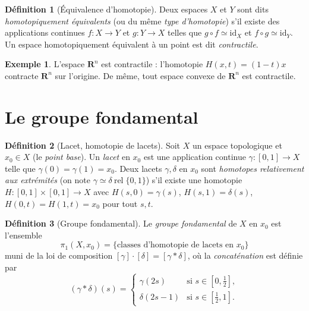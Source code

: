 \documentclass[12pt,a4paper,openany]{book}
\theoremstyle{definition}
\newtheorem{definition}{Définition}[chapter]
\theoremstyle{cours}
\theoremstyle{coursnormal}
\newtheorem{exemple}[theoreme]{Exemple}
\begin{document}
\begin{definition}[Équivalence d'homotopie]
\label{def:equivalence-homotopie}
Deux espaces $X$ et $Y$ sont dits \emph{homotopiquement équivalents}
(ou du même \emph{type d'homotopie}) s'il existe des applications
continues $f\colon X\to Y$ et $g\colon Y\to X$ telles que
$g\circ f\simeq\mathrm{id}_X$ et $f\circ g\simeq\mathrm{id}_Y$.
Un espace homotopiquement équivalent à un point est dit
\emph{contractile}.
\end{definition}

\begin{exemple}
\label{ex:Rn-contractile}
L'espace $\mathbf{R}^n$ est contractile : l'homotopie
$H(x,t)=(1-t)x$ contracte $\mathbf{R}^n$ sur l'origine.
De même, tout espace convexe de $\mathbf{R}^n$ est contractile.
\end{exemple}

\section{Le groupe fondamental}
\label{sec:groupe-fondamental}

\begin{definition}[Lacet, homotopie de lacets]
\label{def:lacet}
Soit $X$ un espace topologique et $x_0\in X$ (le \emph{point base}).
Un \emph{lacet} en $x_0$ est une application continue
$\gamma\colon[0,1]\to X$ telle que $\gamma(0)=\gamma(1)=x_0$.
Deux lacets $\gamma,\delta$ en $x_0$ sont \emph{homotopes relativement
aux extrémités} (on note $\gamma\simeq\delta\ \mathrm{rel}\;\{0,1\}$)
s'il existe une homotopie $H\colon[0,1]\times[0,1]\to X$ avec
$H(s,0)=\gamma(s)$, $H(s,1)=\delta(s)$, $H(0,t)=H(1,t)=x_0$ pour
tout $s,t$.
\end{definition}

\begin{definition}[Groupe fondamental]
\label{def:groupe-fondamental}
Le \emph{groupe fondamental}
de $X$ en $x_0$ est l'ensemble
\[
\pi_1(X,x_0)=\{\text{classes d'homotopie de lacets en }x_0\}
\]
muni de la loi de composition $[\gamma]\cdot[\delta]=[\gamma*\delta]$,
où la \emph{concaténation} est définie par
\[
(\gamma*\delta)(s) =
\begin{cases}
\gamma(2s) & \text{si } s\in[0,\tfrac{1}{2}],\\
\delta(2s-1) & \text{si } s\in[\tfrac{1}{2},1].
\end{cases}
\]
\end{definition}
\end{document}
